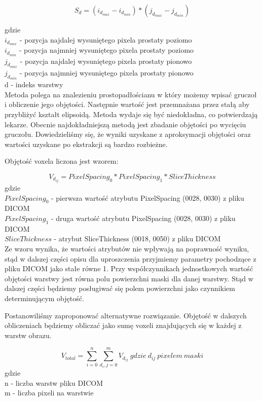 \documentclass[a4paper,11pt,twoside]{report}
\theoremstyle{definition}
\begin{document}
\[S_d = (i_{d_{max}} - i_{d_{min}}) * (j_{d_{max}} - j_{d_{min}})\] 

gdzie \\
\(i_{d_{max}}\) - pozycja najdalej wysuniętego pixela prostaty poziomo \\
\(i_{d_{min}}\) - pozycja najmniej wysuniętego pixela prostaty poziomo \\
\(j_{d_{max}}\) - pozycja najdalej wysuniętego pixela prostaty pionowo \\
\(j_{d_{min}}\) - pozycja najmniej wysuniętego pixela prostaty pionowo \\
d - indeks warstwy \\

Metoda polega na znalezieniu prostopadłościanu w który możemy wpisać gruczoł i obliczenie jego objętości. Następnie wartość jest przemnażana przez stałą aby przybliżyć kształt elipsoidą. Metoda wydaje się być niedokładna, co potwierdzają lekarze. Obecnie najdokładniejszą metodą jest zbadanie objętości po wycięciu gruczołu. Dowiedzieliśmy się, że wyniki uzyskane z aproksymacji objętości oraz wartości uzyskane po ekstrakcji są bardzo rozbieżne. 


Objętość voxela liczona jest wzorem:

\[ V_{d_{ij}} = PixelSpacing_0 * PixelSpacing_1 * SliceThickness\]
gdzie \\
\(PixelSpacing_0\) - pierwsza wartość atrybutu PixelSpacing (0028, 0030) z pliku DICOM \\
\(PixelSpacing_1\)  - druga wartość atrybutu PixelSpacing (0028, 0030) z pliku DICOM \\
\(SliceThickness\) - atrybut SliceThickness (0018, 0050) z pliku DICOM \\

Ze wzoru wynika, że wartości atrybutów nie wpływają na poprawność wyniku, stąd w dalszej części opisu dla uproszczenia przyjmiemy parametry pochodzące z pliku DICOM jako stałe równe 1. Przy współczynnikach jednostkowych wartość objętości warstwy jest równa polu powierzchni maski dla danej warstwy. Stąd w dalszej części będziemy posługiwać się polem powierzchni jako czynnikiem determinującym objętość.

\par
Postanowiliśmy zaproponować alternatywne rozwiązanie. Objętość w dalszych obliczeniach będziemy obliczać jako sumę voxeli znajdujących się w każdej z warstw obrazu. 

\[ V_{total} = \sum_{i=0}^{n} \sum_{d_i, j=0}^{m} V_{d_{ij}} \ gdzie\ d_{ij}\ pixelem\ maski \]
gdzie \\
n - liczba warstw pliku DICOM \\
m - liczba pixeli na warstwie \\
\end{document}
